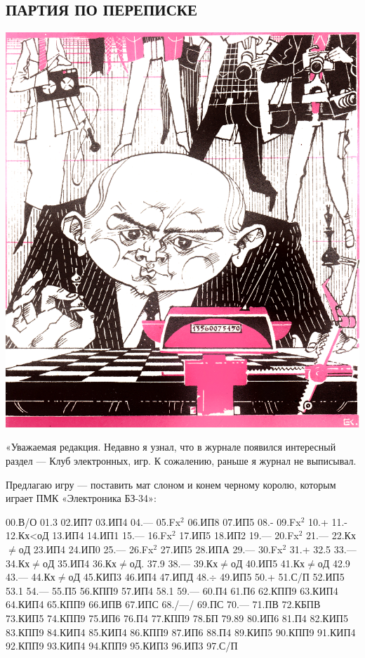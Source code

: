 \documentclass[11pt,a4paper,oneside]{article}
\begin{document}
\subsection{ПАРТИЯ ПО ПЕРЕПИСКЕ}
\includegraphics[width=\textwidth]{mail1}

«Уважаемая редакция. Недавно я узнал, что в журнале появился интересный раздел — Клуб электронных, игр. К сожалению, раньше я журнал не выписывал.

Предлагаю игру — поставить мат слоном и конем черному королю, которым играет ПМК «Электроника БЗ-34»:

00.В/О 01.3 02.ИП7 03.ИП4 04.— 05.Fx$^{2}$ 06.ИП8 07.ИП5 08.- 09.Fx$^{2}$
10.+ 11.- 12.Кх<оД 13.ИП4 14.ИП1 15.—	16.Fx$^{2}$ 17.ИП5 18.ИП2	19.—
20.Fx$^{2}$ 21.— 22.Кх$\neq$оД 23.ИП4 24.ИП0 25.— 26.Fx$^{2}$ 27.ИП5 28.ИПА 29.— 30.Fx$^{2}$ 31.+ 32.5 33.— 34.Кх$\neq$оД
35.ИП4 36.Кх$\neq$оД. 37.9 38.—
39.Кх$\neq$оД 40.ИП5 41.Кх$\neq$оД 42.9
43.— 44.Кх$\neq$оД 45.КИП3 46.ИП4 47.ИПД 48.$\div$ 49.ИП5 50.+ 51.С/П
52.ИП5 53.1 54.— 55.П5 56.КПП9
57.ИП4 58.1 59.— 60.П4 61.П6 62.КПП9 63.КИП4 64.КИП4 65.КПП9 66.ИПВ 67.ИПС 68./—/ 69.ПС 70.— 71.ПВ 72.КБПВ 73.КИП5 74.КПП9 75.ИП6 76.П4 77.КПП9 78.БП 79.89 80.ИП6 81.П4 82.КИП5 83.КПП9 84.КИП4
85.КИП4 86.КПП9 87.ИП6 88.П4
89.КИП5 90.КПП9 91.КИП4 92.КПП9 93.КИП4 94.КПП9 95.КИП3 96.ИП3 97.С/П
\end{document}
